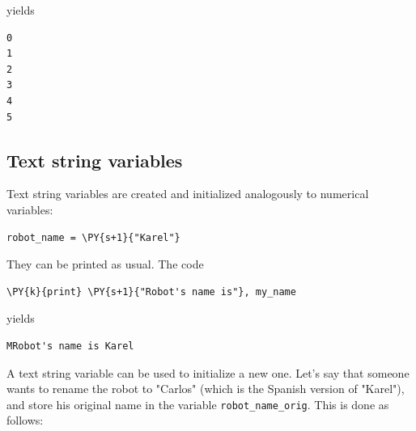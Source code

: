 \noindent
yields\\

\begin{ybox}
\begin{Verbatim}[commandchars=\\\{\}]
0
1
2
3
4
5
\end{Verbatim}
\end{ybox}
\vspace{6mm}

\noindent

\subsection[\ \ Text string variables]{Text string variables}

Text string variables are created and initialized analogously 
to numerical variables:\\

\begin{bbox}
\begin{Verbatim}[commandchars=\\\{\}]
robot_name = \PY{s+1}{"Karel"}
\end{Verbatim}
\end{bbox}
\vspace{6mm}
 
\noindent
They can be printed as usual. The code\\

\begin{bbox}
\begin{Verbatim}[commandchars=\\\{\}]
\PY{k}{print} \PY{s+1}{"Robot's name is"}, my_name
\end{Verbatim}
\end{bbox}
\vspace{6mm}

\noindent
yields\\

\begin{ybox}
\begin{Verbatim}[commandchars=\\\{\}]
MRobot's name is Karel
\end{Verbatim}
\end{ybox}
\vspace{6mm}

\noindent
A text string variable can be used to initialize a new one. Let's say 
that someone wants to rename the robot to "Carlos" (which is the Spanish 
version of "Karel"),
and store his original name in the variable {\tt robot\_name\_orig}. 
This is done as follows:\\

